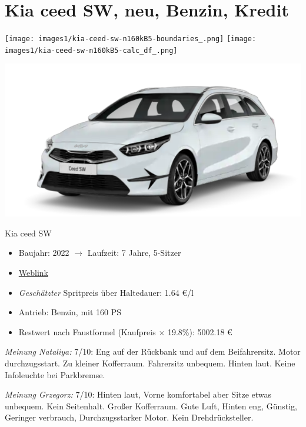 \documentclass[landscape, DIV=99, 14pt]{scrartcl}
\begin{document}
\twocolumn

\section*{Kia ceed SW, neu, Benzin, Kredit}
\begin{center}
\texttt{[image: images1/kia-ceed-sw-n160kB5-boundaries\_.png]}
\null
\vspace{0.5cm}
\texttt{[image: images1/kia-ceed-sw-n160kB5-calc\_df\_.png]}
\end{center}

\pagebreak
\begin{center}
\includegraphics[width=0.9\columnwidth]{cars/kia-ceed-sportswagon.png}

Kia ceed SW
\end{center}

\begin{itemize}
    \item Baujahr: 2022 $\rightarrow$ Laufzeit: 7 Jahre, 5-Sitzer
    \item \href{https://konfigurator.meinauto.de/kia/neuwagen/cee-d/angebote/cee-d-sporty-wagon/konfigurator/\#!/extras/spirit/8865371/3,11,27/private/109347-4167-291321/1321/61d21ce73c5db/cash-purchase/109348-8088-291322/48,0,10000,0,0,0,0,0,}{Weblink}
    \item \emph{Gesch\"atzter} Spritpreis \"uber Haltedauer: 1.64 \euro{}/l
    \item Antrieb: Benzin, mit 160 PS
    \item Restwert nach Faustformel (Kaufpreis $\times$ 19.8\%): 5002.18 \euro{}
\end{itemize}

\begin{small}
\emph{Meinung Nataliya:} 7/10: Eng auf der Rückbank und auf dem Beifahrersitz. Motor durchzugsstart. Zu kleiner Kofferraum. Fahrersitz unbequem. Hinten laut. Keine Infoleuchte bei Parkbremse.
        
\emph{Meinung Grzegorz:} 7/10: Hinten laut, Vorne komfortabel aber Sitze etwas unbequem. Kein Seitenhalt. Großer Kofferraum. Gute Luft, Hinten eng, Günstig, Geringer verbrauch, Durchzugsstarker Motor. Kein Drehdrücksteller.
\end{small}
\end{document}
